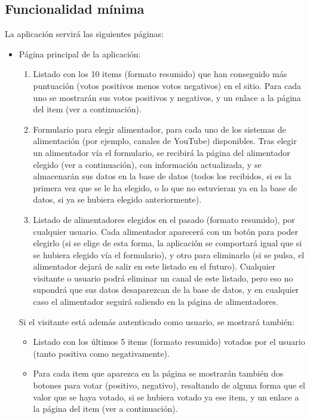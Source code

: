 \subsection{Funcionalidad mínima}

La aplicación servirá las siguientes páginas:

\begin{itemize}
  \item Página principal de la aplicación:
  
    \begin{enumerate}
    \item Listado con los 10 items (formato resumido) que han conseguido más puntuación (votos positivos menos votos negativos) en el sitio. Para cada uno se mostrarán sus votos positivos y negativos, y un enlace a la página del item (ver a continuación).
    \item Formulario para elegir alimentador, para cada uno de los sistemas de alimentación (por ejemplo, canales de YouTube) disponibles. Tras elegir un alimentador vía el formulario, se recibirá la página del alimentador elegido (ver a continuación), con información actualizada, y se almacenarán sus datos en la base de datos (todos los recibidos, si es la primera vez que se le ha elegido, o lo que no estuvieran ya en la base de datos, si ya se hubiera elegido anteriormente).
    \item Listado de alimentadores elegidos en el pasado (formato resumido), por cualquier usuario. Cada alimentador aparecerá con un botón para poder elegirlo (si se elige de esta forma, la aplicación se comportará igual que si se hubiera elegido vía el formulario), y otro para eliminarlo (si se pulsa, el alimentador dejará de salir en este listado en el futuro). Cualquier visitante o usuario podrá eliminar un canal de este listado, pero eso no supondrá que sus datos desaparezcan de la base de datos, y en cualquier caso el alimentador seguirá saliendo en la página de alimentadores.
    \end{enumerate}

    Si el visitante está además autenticado como usuario, se mostrará también:

    \begin{itemize}
    \item Listado con los últimos 5 items (formato resumido) votados por el usuario (tanto positiva como negativamente).
    \item Para cada item que aparezca en la página se mostrarán también dos botones para votar (positivo, negativo), resaltando de alguna forma que el valor que se haya votado, si se hubiera votado ya ese item, y un enlace a la página del item (ver a continuación).
    \end{itemize}


\end{itemize}
